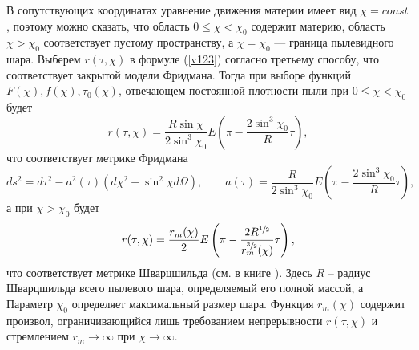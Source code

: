 \documentclass[12pt]{article}
\newcommand{\bq}{\begin{equation}}
\newcommand{\eq}{\end{equation}}
\begin{document}
В сопутствующих координатах уравнение движения материи имеет вид $\chi = const$, поэтому можно сказать, что область $0 \leqslant \chi < \chi_0$ содержит материю, область $\chi > \chi_0$ соответствует пустому пространству, а $\chi = \chi_0$ --- граница пылевидного шара.
Выберем $r(\tau, \chi)$ в формуле (\ref{v123}) согласно третьему способу, что соответствует закрытой модели Фридмана.
Тогда при выборе функций $F(\chi), f(\chi), \tau_0(\chi)$, отвечающем постоянной плотности пыли
при $0 \leqslant \chi < \chi_0$ будет
\bq
	r(\tau, \chi) = \frac{R \sin{\chi}}{2 \sin^3{\chi_0}}  E \left( \pi - \frac{2 \sin^3{\chi_0}}{R} \tau \right),
\eq
что соответствует метрике Фридмана
\bq
ds^2 = d\tau^2 - a^2(\tau) \left(d\chi^2 + \sin^2{\chi}d\Omega \right),\qquad
a(\tau) = \frac{R}{2 \sin^3{\chi_0}} E \left( \pi - \frac{2 \sin^3{\chi_0}}{R} \tau \right),
\eq
а при $\chi > \chi_0$ будет 
\bq
r(\tau, \chi) = \frac{r_m(\chi)}{2} E \left( \pi - \frac{2R^{\sfrac{1}{2}}}{r^{\sfrac{3}{2}}_m(\chi)} \tau \right),
\eq
что соответствует метрике Шварцшильда (см. в книге \cite{landavshic2}).
Здесь $R$ -- радиус Шварцшильда всего пылевого шара, определяемый его полной массой, а 
Параметр $\chi_0$ определяет максимальный размер шара. Функция $r_m(\chi)$ содержит произвол, ограничивающийся лишь требованием непрерывности $r(\tau, \chi)$ и стремлением $r_m \to \infty$ при $\chi \to \infty$.
\end{document}
